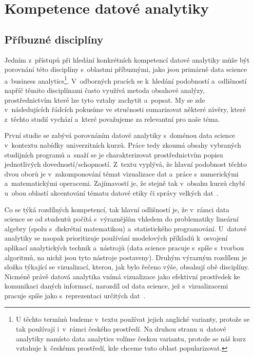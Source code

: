 \hypertarget{kompetence-datovuxe9-analytiky}{%
\section{Kompetence datové analytiky}\label{kompetence-datovuxe9-analytiky}}

\hypertarget{pux159uxedbuznuxe9-discipluxedny}{%
\subsection{Příbuzné disciplíny}\label{pux159uxedbuznuxe9-discipluxedny}}

Jedním z~přístupů při hledání konkrétních kompetencí datové analytiky může být porovnání této disciplíny s~oblastmi příbuznými, jako jsou primárně data science a~business analytics\footnote{U těchto termínů budeme v~textu používat jejich anglické varianty, protože se tak používají i~v~rámci českého prostředí. Na druhou stranu u~datové analytiky namísto data analytics volíme českou variantu, protože se náš kurz vztahuje k~českému prostředí, kde chceme tuto oblast popularizovat.}. V~odborných pracích se k~hledání podobností a~odlišností napříč těmito disciplínami často využívá metoda obsahové analýzy, prostřednictvím které lze tyto vztahy zachytit a~popsat. My se zde v~následujících řádcích pokusíme ve stručnosti sumarizovat některé závěry, které z~těchto studií vychází a~které považujeme za relevantní pro naše téma.

První studie se zabývá porovnáním datové analytiky s~doménou data science v~kontextu nabídky univerzitních kurzů. Práce tedy zkoumá obsahy vybraných studijních programů a~snaží se je charakterizovat prostřednictvím popisu jednotlivých dovedností/schopností. Z~textu vyplývá, že hlavní podobnost těchto dvou oborů je v~zakomponování témat vizualizace dat a~práce s~numerickými a~matematickými operacemi. Zajímavostí je, že stejně tak v~obsahu kurzů chybí u~obou oblastí akcentování tématu datové etiky či správy velkých dat~\parencite[109]{aasheim2015}.

Co se týká rozdílných kompetencí, tak hlavní odlišností je, že v~rámci data science se od studentů počítá s~výraznějším vhledem do problematiky lineární algebry (spolu s~diskrétní matematikou) a~statistického programování. U~datové analytiky se naopak prioritizuje používání modelových příkladů k~osvojení aplikací analytických technik a~nástrojů (data science pracuje s~spíše s~tvorbou algoritmů, na nichž jsou tyto nástroje postaveny). Druhým výrazným rozdílem je složka týkající se vizualizací, kterou, jak bylo řečeno výše, obsahují obě disciplíny. Nicméně právě datová analytika vnímá vizualizace jako efektivní prostředek ke komunikaci daných informací, narozdíl od data science, jež s~vizualizacemi pracuje spíše jako s~reprezentaci určitých dat~\parencite[110]{aasheim2015}.

